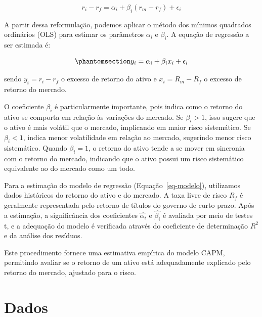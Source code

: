 \documentclass[
  12pt,
  a4paperpaper,
]{article}
\begin{document}
\[
r_i - r_f = \alpha_i + \beta_i (r_m - r_f) + \epsilon_i
\]

A partir dessa reformulação, podemos aplicar o método dos mínimos
quadrados ordinários (OLS) para estimar os parâmetros \(\alpha_i\) e
\(\beta_i\). A equação de regressão a ser estimada é:

\begin{equation}\phantomsection\label{eq-modelo}{
y_i = \alpha_i + \beta_i x_i + \epsilon_i
}\end{equation}

sendo \(y_i = r_i - r_f\) o excesso de retorno do ativo e
\(x_i = R_m - R_f\) o excesso de retorno do mercado.

O coeficiente \(\beta_i\) é particularmente importante, pois indica como
o retorno do ativo se comporta em relação às variações do mercado. Se
\(\beta_i > 1\), isso sugere que o ativo é mais volátil que o mercado,
implicando em maior risco sistemático. Se \(\beta_i < 1\), indica menor
volatilidade em relação ao mercado, sugerindo menor risco sistemático.
Quando \(\beta_i = 1\), o retorno do ativo tende a se mover em sincronia
com o retorno do mercado, indicando que o ativo possui um risco
sistemático equivalente ao do mercado como um todo.

Para a estimação do modelo de regressão (Equação~\ref{eq-modelo}),
utilizamos dados históricos do retorno do ativo e do mercado. A taxa
livre de risco \(R_f\) é geralmente representada pelo retorno de títulos
do governo de curto prazo. Após a estimação, a significância dos
coeficientes \(\hat{\alpha_i}\) e \(\hat{\beta_i}\) é avaliada por meio
de testes t, e a adequação do modelo é verificada através do coeficiente
de determinação \(R^2\) e da análise dos resíduos.

Este procedimento fornece uma estimativa empírica do modelo CAPM,
permitindo avaliar se o retorno de um ativo está adequadamente explicado
pelo retorno do mercado, ajustado para o risco.

\section{Dados}\label{sec-dados}
\end{document}
